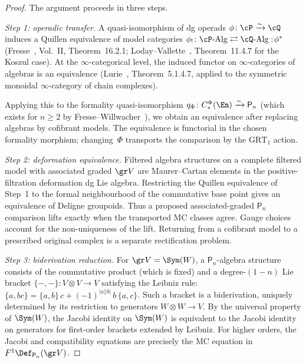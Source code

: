 \begin{proof}
The argument proceeds in three steps.

\emph{Step 1: operadic transfer.}
A quasi-isomorphism of dg operads
$\phi\colon \cP \xrightarrow{\sim} \cQ$ induces a Quillen
equivalence of model categories
$\phi_!\colon \cP\text{-}\mathrm{Alg}
\rightleftarrows \cQ\text{-}\mathrm{Alg} :\! \phi^*$
(Fresse~\cite{Fresse17}, Vol.~II, Theorem~16.2.1;
Loday--Vallette~\cite{LV12}, Theorem~11.4.7 for the Koszul
case).
At the $\infty$-categorical level, the induced functor on
$\infty$-categories of algebras is an equivalence
(Lurie~\cite{HA}, Theorem~5.1.4.7, applied to the symmetric
monoidal $\infty$-category of chain complexes).

Applying this to the formality quasi-isomorphism
$q_\Phi\colon C_*^\Phi(\En) \xrightarrow{\sim} \mathsf{P}_n$ (which
exists for $n \geq 2$ by
Fresse--Willwacher~\cite{FresseWillwacher20}),
we obtain an equivalence after replacing algebras by cofibrant
models. The equivalence is functorial in the chosen formality
morphism; changing~$\Phi$ transports the comparison by the
$\mathrm{GRT}_1$ action.

\emph{Step 2: deformation equivalence.}
Filtered algebra structures on a complete filtered model with
associated graded $\gr V$ are Maurer--Cartan elements in the
positive-filtration deformation dg Lie algebra. Restricting the
Quillen equivalence of Step~1 to the formal neighbourhood of the
commutative base point gives an equivalence of Deligne groupoids.
Thus a proposed associated-graded $\mathsf{P}_n$ comparison lifts
exactly when the transported MC classes agree. Gauge choices account
for the non-uniqueness of the lift. Returning from a cofibrant model
to a prescribed original complex is a separate rectification problem.

\emph{Step 3: biderivation reduction.}
For $\gr V = \Sym(W)$, a
$\mathsf{P}_n$-algebra structure consists of the commutative
product (which is fixed) and a degree-$(1{-}n)$ Lie bracket
$\{-,-\}\colon V \otimes V \to V$ satisfying the Leibniz
rule: $\{a, bc\} = \{a,b\}\,c + (-1)^{|a||b|}\,b\,\{a,c\}$.
Such a bracket is a biderivation, uniquely determined by
its restriction to generators $W \otimes W \to V$.
By the universal property of $\Sym(W)$, the Jacobi identity
on $\Sym(W)$ is equivalent to the Jacobi identity on generators for
first-order brackets extended by Leibniz. For higher orders, the
Jacobi and compatibility equations are precisely the MC equation in
$F^1\Def_{\mathsf{P}_n}(\gr V)$.
\end{proof}

